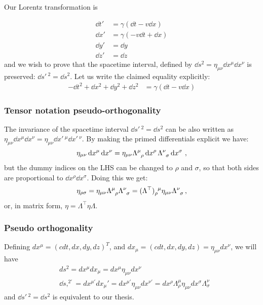 \documentclass[main.tex]{subfiles}
\begin{document}
Our Lorentz transformation is

\begin{subequations}
\begin{align}
    \dd{t}' &= \gamma (\dd{t} - v \dd{x}) \\
    \dd{x}' &= \gamma (-v\dd{t} + \dd{x}) \\
    \dd{y}' &= \dd{y} \\
    \dd{z}' &= \dd{z}
\end{align}
\end{subequations}
%
and we wish to prove that the spacetime interval, defined by $\dd{s^2} = \eta_{\mu\nu} \dd{x^\mu}\dd{x^\nu}$ is preserved: $\dd{s'\,^2} = \dd{s^2}$.
Let us write the claimed equality explicitly:
%
\begin{subequations}
\begin{align}
    -\dd{t^2} + \dd{x^2}+ \dd{y^2}+ \dd{z^2}
    &= \gamma (\dd{t} - v \dd{x})
\end{align}
\end{subequations}


\subsubsection{Tensor notation pseudo-orthogonality}

The invariance of the spacetime interval $\dd{s'\,^2} = \dd{s^2}$ can be also written as \(\eta_{\mu\nu} \dd{x^\mu} \dd{x^\nu} = \eta_{\mu\nu} \dd{x'\,^\mu} \dd{x'\,^\nu}\). By making the primed differentials explicit we have:
%
\begin{equation}
  \eta_{\mu\nu} \dd{x^\mu} \dd{x^\nu}
  =
  \eta_{\mu\nu} \tensor{\Lambda}{^\mu_\rho} \dd{x^\rho} \tensor{\Lambda}{^\nu_\sigma} \dd{x^\sigma} \,,
\end{equation}
%
but the dummy indices on the LHS can be changed to \(\rho\) and \(\sigma\), so that both sides are proportional to  \(\dd{x^\rho}\dd{x^\sigma}\). Doing this we get:
%
\begin{equation}
  \eta_{\rho\sigma}
  =
  \eta_{\mu\nu} \tensor{\Lambda}{^\mu_\rho} \tensor{\Lambda}{^\nu_\sigma}
  =\tensor{(\Lambda^\top)}{_\rho^\mu} \eta_{\mu\nu} \tensor{\Lambda}{^\nu_\sigma} \,,
\end{equation}
%
or, in matrix form, \(\eta = \Lambda^\top \eta \Lambda\).
\subsubsection{Pseudo orthogonality}
Defining $dx^\mu=(cdt,dx,dy,dz)^T$, and $dx_\mu=(cdt,dx,dy,dz)=\eta_{\mu\nu}dx^\nu$, we will have
\begin{align}
&ds^2=dx^\mu dx_\mu=dx^\mu\eta_{\mu\nu}dx^\nu\nonumber\\
&\dd{s,^{2\prime}}=dx^{\mu\prime} dx_\mu'=dx^{\mu\prime}\eta_{\mu\nu}dx^{\nu\prime}=dx^\rho\Lambda_\rho^\mu\eta_{\mu\nu}dx^\sigma\Lambda_\sigma^\nu
\end{align} and $\dd{s'\,^2} = \dd{s^2}$ is equivalent to our thesis.
\end{document}
